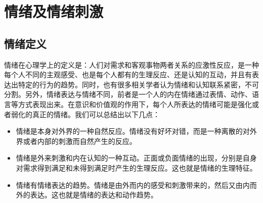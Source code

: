 
\chapter{情绪及情绪刺激}
\label{chap:chap2}
	


\section{情绪定义}
情绪在心理学上的定义是：人们对需求和客观事物两者关系的应激性反应，是一种每个人不同的主观感受、也是每个人都有的生理反应、还是认知的互动，并且有表达出特定的行为的趋势。同时，也有很多相关学者认为情绪和认知联系紧密，不可分割。另外，情绪表达与情绪不同，前者是一个人的内在情绪通过表情、动作、语言等方式表现出来。在意识和价值观的作用下，每个人所表达的情绪可能是强化或者弱化的真正的情绪。我们可以总结出以下几点：
\begin{itemize}
  \item 情绪是本身对外界的一种自然反应。情绪没有好坏对错，而是一种离散的对外界或者内部的刺激而自然产生的反应。
  \item 情绪是外来刺激和内在认知的一种互动。正面或负面情绪的出现，分别是自身对需求得到满足和未得到满足时产生的生理反应。这也就是情绪的生理特征。
  \item 情绪有情绪表达的趋势。情绪是由外而内的感受和刺激带来的，然后又由内而外的表达。这也就是情绪的表达和动作趋势。
\end{itemize}

